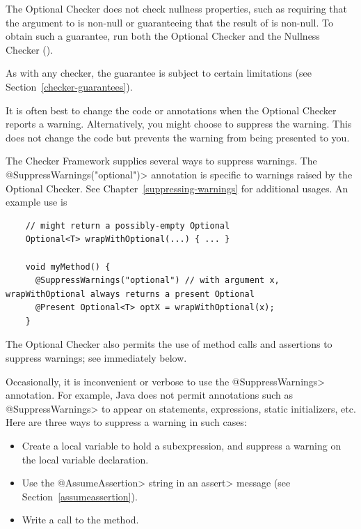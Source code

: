 The Optional Checker does not check nullness properties, such as requiring
that the argument to
is non-null or guaranteeing that the result of
is non-null.  To obtain such a guarantee, run both the Optional Checker and
the Nullness Checker ().

As with any checker, the guarantee is subject to certain limitations (see
Section~\ref{checker-guarantees}).


It is often best to change the code or annotations when the Optional Checker
reports a warning.
Alternatively, you might choose to suppress the warning.
This does not change the code but prevents the warning from being presented to
you.

\begin{sloppypar}
The Checker Framework supplies several ways to suppress warnings.
The \<@SuppressWarnings("optional")> annotation is specific to warnings raised
by the Optional Checker.
See Chapter~\ref{suppressing-warnings} for additional usages.
An example use is
\end{sloppypar}

\begin{smaller}
\begin{Verbatim}
    // might return a possibly-empty Optional
    Optional<T> wrapWithOptional(...) { ... }

    void myMethod() {
      @SuppressWarnings("optional") // with argument x, wrapWithOptional always returns a present Optional
      @Present Optional<T> optX = wrapWithOptional(x);
    }
\end{Verbatim}
\end{smaller}

The Optional Checker also permits the use of method calls and assertions to
suppress warnings; see immediately below.



Occasionally, it is inconvenient or
verbose to use the \<@SuppressWarnings> annotation.  For example, Java does
not permit annotations such as \<@SuppressWarnings> to appear on
statements, expressions, static initializers, etc.
Here are three ways to suppress a warning in such cases:
\begin{itemize}
\item
  Create a local variable to hold a subexpression, and
  suppress a warning on the local variable declaration.
\item
  Use the \<@AssumeAssertion> string in
  an \<assert> message (see Section~\ref{assumeassertion}).
\item
  Write a call to the
   method.
\end{itemize}

